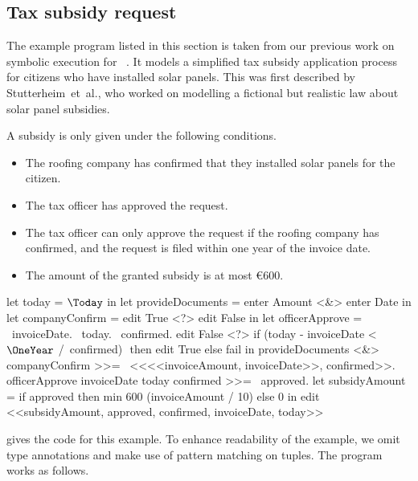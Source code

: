 \subsection{Tax subsidy request}
\label{sec:tax}

The example program listed in this section is taken from our previous work on symbolic execution for \TOPHAT~\cite{DBLP:conf/ppdp/SteenvoordenNK19}.
It models a simplified tax subsidy application process for citizens who have installed solar panels.
This was first described by Stutterheim~et~al.\cite{conf/sfp/StutterheimAP17},
who worked on modelling a fictional but realistic law about solar panel subsidies.

A subsidy is only given under the following conditions.
\begin{itemize}
\item The roofing company has confirmed that they installed solar panels for the citizen.
\item The tax officer has approved the request.
\item The tax officer can only approve the request if the roofing company has confirmed, and the request is filed within one year of the invoice date.
\item The amount of the granted subsidy is at most €600.
\end{itemize}

\begin{TASK}[
    float=ht,
    numbers=right,
    caption={Subsidy request and approval workflow at the Dutch tax office.},
    captionpos=b,
    label=lst:tax]
  let today = $\Today$ in
  let provideDocuments = enter Amount <&> enter Date in
  let companyConfirm = edit True <?> edit False in
  let officerApprove = \ invoiceDate. \ today. \ confirmed.
    edit False <?> if (today - invoiceDate < $\OneYear$ /\ confirmed) $\label{lst:tax:officer-approve-def}$ then edit True else fail in
  provideDocuments <&> companyConfirm >>= \ <<<<invoiceAmount, invoiceDate>>, confirmed>>. $\label{lst:tax:documents-and-company-confirm}$
  officerApprove invoiceDate today confirmed >>= \ approved.$\label{lst:tax:officer-approve}$
  let subsidyAmount = if approved then min 600 (invoiceAmount / 10) else 0 in
  edit <<subsidyAmount, approved, confirmed, invoiceDate, today>>$\label{lst:tax:result}$
\end{TASK}

 gives the \TOPHAT code for this example.
To enhance readability of the example,
we omit type annotations and make use of pattern matching on tuples.
The program works as follows.

